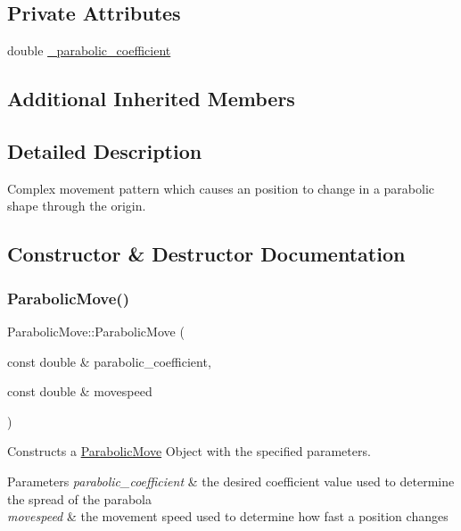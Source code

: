 \subsection*{Private Attributes}
\begin{DoxyCompactItemize}
\item 
double \hyperlink{class_parabolic_move_a4ae7c298df76cb1a0f5f7d6f85c0977c}{\+\_\+parabolic\+\_\+coefficient}
\end{DoxyCompactItemize}
\subsection*{Additional Inherited Members}


\subsection{Detailed Description}
Complex movement pattern which causes an position to change in a parabolic shape through the origin. 

\subsection{Constructor \& Destructor Documentation}
\mbox{\label{class_parabolic_move_a94fb02788b26d03abccee8254401902d}} 
\subsubsection{\texorpdfstring{Parabolic\+Move()}{ParabolicMove()}}
{\footnotesize\ttfamily Parabolic\+Move\+::\+Parabolic\+Move (\begin{DoxyParamCaption}\item[{const double \&}]{parabolic\+\_\+coefficient,  }\item[{const double \&}]{movespeed }\end{DoxyParamCaption})}



Constructs a \hyperlink{class_parabolic_move}{Parabolic\+Move} Object with the specified parameters. 


\begin{DoxyParams}{Parameters}
{\em parabolic\+\_\+coefficient} & the desired coefficient value used to determine the spread of the parabola \\
\hline
{\em movespeed} & the movement speed used to determine how fast a position changes \\
\hline
\end{DoxyParams}


